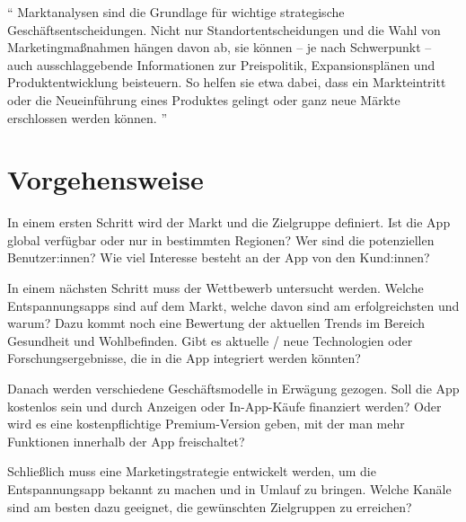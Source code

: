 "`
Marktanalysen sind die Grundlage für wichtige strategische Geschäftsentscheidungen. 
Nicht nur Standortentscheidungen und die Wahl von Marketingmaßnahmen hängen davon ab, sie können – je nach 
Schwerpunkt – auch ausschlaggebende Informationen zur Preispolitik, Expansionsplänen und Produktentwicklung 
beisteuern. So helfen sie etwa dabei, dass ein Markteintritt oder die Neueinführung eines Produktes gelingt
oder ganz neue Märkte erschlossen werden können. 
"'
\cite{marktanalyse}

\section{Vorgehensweise}

In einem ersten Schritt wird der Markt und die Zielgruppe definiert. 
Ist die App global verfügbar oder nur in bestimmten Regionen? Wer sind die potenziellen Benutzer:innen?
Wie viel Interesse besteht an der App von den Kund:innen?

In einem nächsten Schritt muss der Wettbewerb untersucht werden.
Welche Entspannungsapps sind auf dem Markt, welche davon sind am erfolgreichsten und warum?
Dazu kommt noch eine Bewertung der aktuellen Trends im Bereich Gesundheit und Wohlbefinden. 
Gibt es aktuelle / neue Technologien oder Forschungsergebnisse, die in die App integriert werden könnten?

Danach werden verschiedene Geschäftsmodelle in Erwägung gezogen. 
Soll die App kostenlos sein und durch Anzeigen oder In-App-Käufe finanziert werden? 
Oder wird es eine kostenpflichtige Premium-Version geben, mit der man mehr Funktionen innerhalb der App freischaltet?

Schließlich muss eine Marketingstrategie entwickelt werden, um die Entspannungsapp bekannt zu machen und
in Umlauf zu bringen. 
Welche Kanäle sind am besten dazu geeignet, die gewünschten Zielgruppen zu erreichen?


